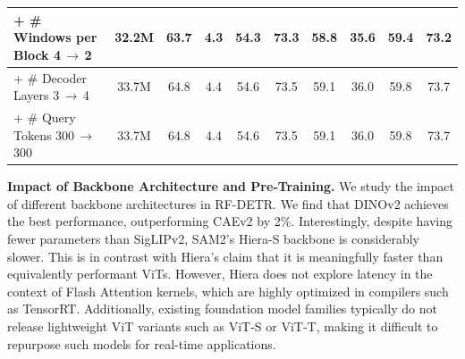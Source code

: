 \documentclass{article} %
\newcommand{\method}{RF-DETR}
\begin{document}
{\begin{table}[t]
{\begin{tabular}{|lccccccccc|}
\multicolumn{1}{|l|}{\quad + \# Windows per Block 4$\,\to\,$2 }     &   32.2M       &  63.7    &  \multicolumn{1}{c|}{4.3}             &  54.3  &  73.3    & 58.8 & 35.6 & 59.4 & 73.2 \\ \hline
\multicolumn{1}{|l|}{\quad + \# Decoder Layers 3$\,\to\,$4}     &     33.7M       &   64.8   &  \multicolumn{1}{c|}{4.4}             &  54.6  & 73.5 & 59.1 & 36.0 & 59.8 & 73.7 \\ \hline
\multicolumn{1}{|l|}{\quad + \# Query Tokens 300$\,\to\,$300}    &    33.7M        &   64.8   & \multicolumn{1}{c|}{4.4}             &  54.6  & 73.5 & 59.1 & 36.0 & 59.8 & 73.7 \\ \hline
\end{tabular}
}
\end{table}
}

\textbf{Impact of Backbone Architecture and Pre-Training.} 
We study the impact of different backbone architectures in \method. We find that DINOv2 achieves the best performance, outperforming CAEv2 by 2\%. Interestingly, despite having fewer parameters than SigLIPv2, SAM2's Hiera-S backbone is considerably slower. This is in contrast with Hiera's claim that it is meaningfully faster than equivalently performant ViTs. However, Hiera does not explore latency in the context of Flash Attention kernels, which are highly optimized in compilers such as TensorRT. Additionally, existing foundation model families typically do not release lightweight ViT variants such as ViT-S or ViT-T, making it difficult to repurpose such models for real-time applications.
\end{document}
